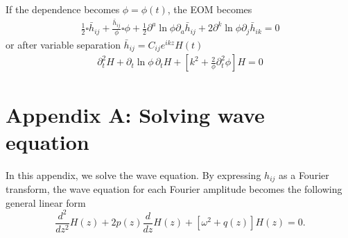 \documentclass[
 jor,
 amsmath,amssymb,preprint,
]{revtex4-2}
\begin{document}
If the dependence becomes $\phi = \phi(t)$, the EOM becomes
\begin{equation}
\begin{aligned}
\frac{1}{2}\square \bar{h}_{ij} + \frac{\bar{h}_{ij}}{\phi}\square \phi + \frac{1}{2} \partial^a \ln\phi \partial_a\bar{h}_{ij} + 2\partial^k \ln\phi\partial_j \bar{h}_{ik} = 0
\end{aligned}
\end{equation}
or after variable separation $\bar{h}_{ij} = C_{ij}e^{ikz}H(t)$
\begin{equation}
\begin{aligned}
\partial_t^2H + \partial_t\ln\phi\,\partial_tH + \left[k^2 + \frac{2}{\phi}\partial_t^2 \phi\right] H = 0
\end{aligned}
\end{equation}
\begin{comment}
This, in terms of eq.\eqref{lapsol} with $y(t) = 2\partial_t^2\phi - \frac{1}{2}\partial_t^2\ln\phi = \frac{3}{2}\partial_t^2\ln\phi = -\frac{3}{2}\partial_t^2\ln G$, $g(t) = -\ln G$, also makes the forward GW having the following relation during propagation
\begin{equation}
\begin{aligned}
h^{(o)}_{ab}(\omega) = & \sqrt{\frac{G_o}{G_s}} \exp\bigg[ik t\frac{3\partial_t^2 \ln G_o}{4k^2} \bigg] h_{ab}^{(s)}(\omega) = \sqrt{\frac{G_o}{G_s}} \exp\bigg[i\omega t\frac{3\partial_t^2 \ln G_o}{4k^2} \bigg] h_{ab}^{(s)}(\omega)\,. \label{ehlapsol}
\end{aligned}
\end{equation}
The dispersion relations from the phase corrections are given by
\begin{align}
\omega = & k - \frac{ 4\nabla^2\ln G_o -\partial_z^2 \ln G_o}{4k} \quad \bigg( = k + \frac{ 3\nabla^2 \ln G_o}{4k}????? \bigg) \,, \\
\omega = & k + \frac{ 3\partial_t^2 \ln G_o}{4k} \,.
\end{align}
in eq.\eqref{ehsptsol} and eq.\eqref{ehlapsol} respectively. These dispersion relation gives rise to the derivate from light speed by
\begin{align}
|\nabla^2\ln G| < \frac{16\pi^2}{3} f^2 \Delta c\,, \\
|\partial_t^2\ln G| < \frac{16\pi^2}{3} f^2 \Delta c\,.
\end{align}
\end{comment}

\section{Appendix A: Solving wave equation}
\label{sec:appa}
In this appendix, we solve the wave equation. By expressing $h_{ij}$ as a Fourier transform, the
wave equation for each Fourier amplitude becomes the following general linear form
\begin{equation}
    \frac{d^2}{d z^2}H(z)+2p(z)\frac{d}{d z}H(z)+\left[\omega^2+q(z)\right]H(z)=0.\label{dessoleq}
\end{equation}
\end{document}
